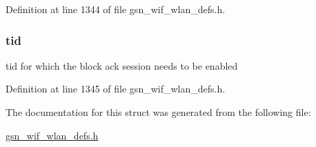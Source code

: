 Definition at line 1344 of file gsn\_\-wif\_\-wlan\_\-defs.h.

\hypertarget{a00370_abf69ed815c8482f9995e41bc0aff9043}{
\subsubsection[{tid}]{ {\bf tid}}}
\label{a00370_abf69ed815c8482f9995e41bc0aff9043}
tid for which the block ack session needs to be enabled 

Definition at line 1345 of file gsn\_\-wif\_\-wlan\_\-defs.h.



The documentation for this struct was generated from the following file:\begin{DoxyCompactItemize}
\item 
\hyperlink{a00613}{gsn\_\-wif\_\-wlan\_\-defs.h}\end{DoxyCompactItemize}
